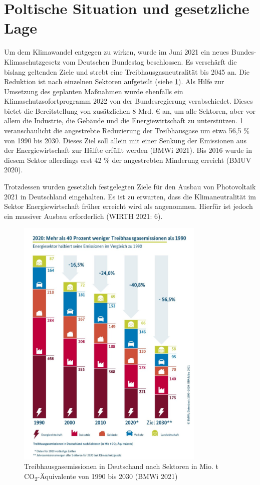 \documentclass[11pt]{scrartcl}
\begin{document}
\section{Poltische Situation und gesetzliche Lage}
Um dem Klimawandel entgegen zu wirken, wurde im Juni 2021 ein neues Bundes-Klimaschutzgesetz vom Deutschen Bundestag beschlossen.
Es verschärft die bislang geltenden Ziele und strebt eine Treibhausgasneutralität bis 2045 an.
Die Reduktion ist nach einzelnen Sektoren aufgeteilt (siehe \cref{fig:CO2}).
Als Hilfe zur Umsetzung des geplanten Maßnahmen wurde ebenfalls ein Klimaschutzsofortprogramm 2022 von der Bundesregierung verabschiedet.
Dieses bietet die Bereitstellung von zusätzlichen 8 Mrd. € an, um alle Sektoren, aber vor allem die Industrie, die Gebäude und die Energiewirtschaft zu unterstützen.
\cref{fig:CO2} veranschaulicht die angestrebte Reduzierung der Treibhausgase um etwa 56,5 \% von 1990 bis 2030.
Dieses Ziel soll allein mit einer Senkung der Emissionen aus der Energiewirtschaft zur Hälfte erfüllt werden (BMWi 2021).
Bis 2016 wurde in diesem Sektor allerdings erst 42 \% der angestrebten Minderung erreicht (BMUV 2020).

Trotzdessen wurden gesetzlich festgelegten Ziele für den Ausbau von Photovoltaik 2021 in Deutschland eingehalten.
Es ist zu erwarten, dass die Klimaneutralität im Sektor Energiewirtschaft früher erreicht wird als angenommen.
Hierfür ist jedoch ein massiver Ausbau erforderlich (WIRTH 2021: 6).


\begin{figure}
\centering
\includegraphics[width=0.8\textwidth]{Sophie/co2.jpg}
\caption[Treibhausgasemissionen in Deutschand nach Sektoren in Mio. t CO\textsubscript{2}-Äquivalente von 1990 bis 2030]{Treibhausgasemissionen in Deutschand nach Sektoren in Mio. t CO\textsubscript{2}-Äquivalente von 1990 bis 2030 (BMWi 2021)}
\label{fig:CO2}
\end{figure}
\end{document}
